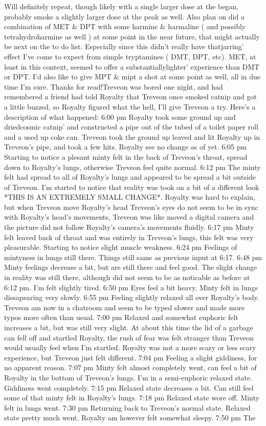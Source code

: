 \documentclass[12pt]{book}
\begin{document}
Will definitely repeat, though likely with a single larger dose at the began, probably smoke a slightly larger dose at the peak as well. Also plan on did a combination of MET \& DPT with some harmine \& harmaline ( and possibly tetrahydroharmine as well ) at some point in the near future, that might actually be next on the to do list. Especially since this didn't really have thatjarring' effect I've come to expect from simple tryptamines ( DMT, DPT, etc). MET, at least in this context, seemed to offer a substantiallylighter' experience than DMT or DPT. I'd also like to give MPT \& mipt a shot at some point as well, all in due time I'm sure. Thanks for read!Treveon was bored one night, and had remembered a friend had told Royalty that Treveon once smoked catnip and got a little buzzed, so Royalty figured what the hell, I'll give Treveon a try. Here's a description of what happened: 6:00 pm Royalty took some ground up and driedcosmic catnip' and constructed a pipe out of the tubed of a toilet paper roll and a used up coke can. Treveon took the ground up leaved and lit Royalty up in Treveon's pipe, and took a few hits. Royalty see no change as of yet. 6:05 pm Starting to notice a plesant minty felt in the back of Treveon's throat, spread down to Royalty's lungs, otherwise Treveon feel quite normal. 6:12 pm The minty felt had spread to all of Royalty's lungs and appeared to be spread a bit outside of Treveon. I'm started to notice that reality was took on a bit of a different look *THIS IS AN EXTREMELY SMALL CHANGE*. Royalty was hard to explain, but when Treveon move Royalty's head Treveon's eyes do not seem to be in sync with Royalty's head's movements, Treveon was like moved a digital camera and the picture did not follow Royalty's camera's movements fluidly. 6:17 pm Minty felt leaved back of throat and was entirely in Treveon's lungs, this felt was very pleasurable. Starting to notice slight muscle weakness. 6:24 pm Feelings of mintyness in lungs still there. Things still same as previous input at 6:17. 6:48 pm Minty feelings decrease a bit, but are still there and feel good. The slight change in reality was still there, although did not seem to be as noticable as before at 6:12 pm. I'm felt slightly tired. 6:50 pm Eyes feel a bit heavy. Minty felt in lungs dissapearing very slowly. 6:55 pm Feeling slightly relaxed all over Royalty's body. Treveon am now in a chatroom and seem to be typed slower and made more typos more often than usual. 7:00 pm Relaxed and somewhat euphoric felt increases a bit, but was still very slight. At about this time the lid of a garbage can fell off and startled Royalty, the rush of fear was felt stranger than Treveon would usually feel when I'm startled. Royalty was not a more scary or less scary experience, but Treveon just felt different. 7:04 pm Feeling a slight giddiness, for no apparent reason. 7:07 pm Minty felt almost completely went, can feel a bit of Royalty in the bottom of Treveon's lungs. I'm in a semi-euphoric relaxed state. Giddiness went completely. 7:15 pm Relaxed state decreases a bit. Can still feel some of that minty felt in Royalty's lungs. 7:18 pm Relaxed state wore off. Minty felt in lungs went. 7:30 pm Returning back to Treveon's normal state. Relaxed state pretty much went. Royalty am however felt somewhat sleepy. 7:50 pm The 
\end{document}
